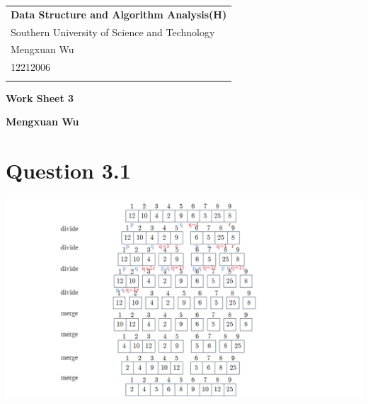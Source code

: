 \documentclass[a4paper,12pt]{article}
\begin{document}
\thispagestyle{empty} %

\begin{tabular}{p{15.5cm}}
{\large \bf Data Structure and Algorithm Analysis(H)} \\
Southern University of Science and Technology \\ Mengxuan Wu \\ 12212006 \\
\hline
\\
\end{tabular}

\vspace*{0.3cm} %

\begin{center}
	{\Large \bf Work Sheet 3}
	\vspace{2mm}

	{\bf Mengxuan Wu}
		
\end{center}  

\vspace{0.4cm}

\section*{Question 3.1}
\begin{center}
	\includegraphics*[width=\linewidth]{Q3.1.PNG}
\end{center}
\end{document}
